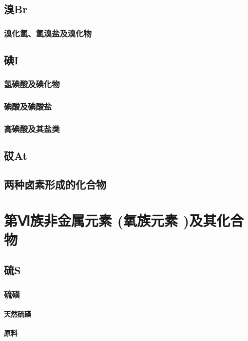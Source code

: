 \documentclass[UTF8]{../03-Chemistry}
\begin{document}
    \subsection{溴Br}
        \subsubsection{溴化氢、氢溴盐及溴化物}

    \subsection{碘I}
        \subsubsection{氢碘酸及碘化物}
        \subsubsection{碘酸及碘酸盐}
        \subsubsection{高碘酸及其盐类}
    \subsection{砹At}
    
    \subsection{两种卤素形成的化合物}

\section{第Ⅵ族非金属元素 (氧族元素 )及其化合物}
    \subsection{硫S}
        \subsubsection{硫磺}
            \paragraph{天然硫磺}
            \paragraph{原料}
\end{document}
